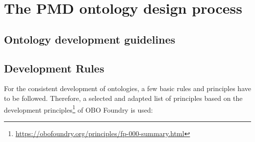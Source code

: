 
\section{The PMD ontology design process}

\subsection{Ontology development guidelines}

\subsection{Development Rules}
For the consistent development of ontologies, a few basic rules and principles have to be followed.
Therefore, a selected and adapted list of principles based on the development principles\footnote{\url{https://obofoundry.org/principles/fp-000-summary.html}} of OBO Foundry\cite{smith2007obo} is used:

